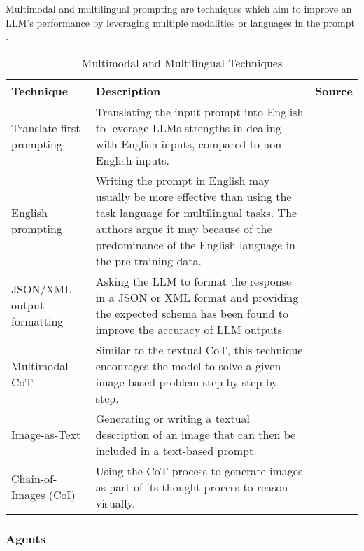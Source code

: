 Multimodal and multilingual prompting are techniques which aim to improve an LLM's performance by leveraging multiple modalities or languages in the prompt \parencite{prompt1}.

\begin{table}[h!]
    \centering
    \begin{tabular}{p{3cm} p{8cm} p{2cm}}
        \toprule
        \textbf{Technique} & \textbf{Description} & \textbf{Source} \\
        \midrule
        \raggedright
        Translate-first prompting & Translating the input prompt into English to leverage LLMs strengths in dealing with English inputs, compared to non-English inputs. & \textcite{translate-first} \\
        \hline
        \raggedright
        English prompting & Writing the prompt in English may usually be more effective than using the task language for multilingual tasks. The authors argue it may because of the predominance of the English language in the pre-training data. & \textcite{english-prompting} \\
        \hline
        \raggedright
        JSON/XML output formatting & Asking the LLM to format the response in a JSON or XML format and providing the expected schema has been found to improve the accuracy of LLM outputs  & \textcite{jsonllm} \\
        \hline
        \raggedright
        Multimodal CoT & Similar to the textual CoT, this technique encourages the model to solve a given image-based problem step by step by step. & \textcite{multimodal-cot} \\
        \hline
        \raggedright
        Image-as-Text & Generating or writing a textual description of an image that can then be included in a text-based prompt. & \textcite{images-as-text} \\
        \hline
        \raggedright
        Chain-of-Images (CoI) & Using the CoT process to generate images as part of its thought process to reason visually. & \textcite{coi} \\
        \bottomrule
    \end{tabular}
    \caption{Multimodal and Multilingual Techniques}\label{tab:multi_prompt}
\end{table}

\FloatBarrier{}

\subsubsection{Agents}


